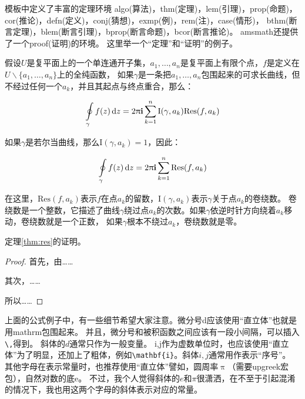 模板中定义了丰富的定理环境
algo(算法)，thm(定理)，lem(引理)，prop(命题)，cor(推论)，defn(定义)，conj(猜想)，exmp(例)，rem(注)，case(情形)，
bthm(断言定理)，blem(断言引理)，bprop(断言命题)，bcor(断言推论)。
amsmath还提供了一个proof(证明)的环境。
这里举一个“定理”和“证明”的例子。
\begin{thm}[留数定理]
\label{thm:res}
  假设$U$是复平面上的一个单连通开子集，$a_1,\ldots,a_n$是复平面上有限个点，$f$是定义在$U\backslash \{a_1,\ldots,a_n\}$上的全纯函数，
  如果$\gamma$是一条把$a_1,\ldots,a_n$包围起来的可求长曲线，但不经过任何一个$a_k$，并且其起点与终点重合，那么：

  \begin{equation}
    \label{eq:res}
    \ointop_{\gamma}f(z)\,\mathrm{d}z = 2\uppi\mathbf{i}\sum^n_{k=1}\mathrm{I}(\gamma,a_k)\mathrm{Res}(f,a_k)
  \end{equation}

  如果$\gamma$是若尔当曲线，那么$\mathrm{I}(\gamma, a_k)=1$，因此：

  \begin{equation}
    \label{eq:resthm}
    \ointop_{\gamma}f(z)\,\mathrm{d}z = 2\uppi\mathbf{i}\sum^n_{k=1}\mathrm{Res}(f,a_k)
  \end{equation}


  在这里，$\mathrm{Res}(f, a_k)$表示$f$在点$a_k$的留数，$\mathrm{I}(\gamma,a_k)$表示$\gamma$关于点$a_k$的卷绕数。
  卷绕数是一个整数，它描述了曲线$\gamma$绕过点$a_k$的次数。如果$\gamma$依逆时针方向绕着$a_k$移动，卷绕数就是一个正数，
  如果$\gamma$根本不绕过$a_k$，卷绕数就是零。

  定理\ref{thm:res}的证明。
  
  \begin{proof}
    首先，由……

    其次，……

    所以……
  \end{proof}
\end{thm}

上面的公式例子中，有一些细节希望大家注意。微分号d应该使用“直立体”也就是用mathrm包围起来。
并且，微分号和被积函数之间应该有一段小间隔，可以插入\verb+\,+得到。
斜体的$d$通常只作为一般变量。
i,j作为虚数单位时，也应该使用“直立体”为了明显，还加上了粗体，例如\verb+\mathbf{i}+。斜体$i,j$通常用作表示“序号”。
其他字母在表示常量时，也推荐使用“直立体”譬如，圆周率$\uppi$（需要upgreek宏包），自然对数的底$\mathrm{e}$。
不过，我个人觉得斜体的$e$和$\pi$很潇洒，在不至于引起混淆的情况下，我也用这两个字母的斜体表示对应的常量。


